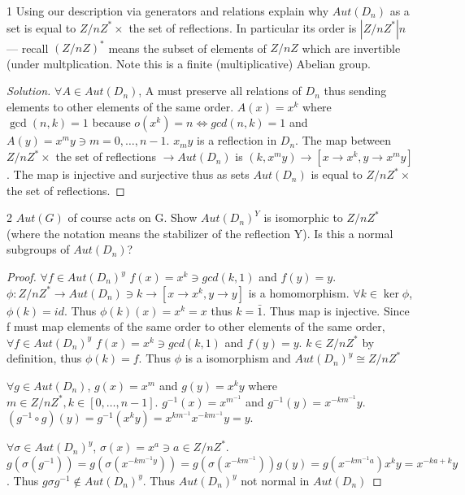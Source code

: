 \documentclass{article}
\newenvironment{solution}
{\renewcommand\qedsymbol{$\blacksquare$}\begin{proof}[Solution]}
{\end{proof}}
\begin{document}
\bigskip

\begin{PROB}{1}\label{Problem 1.}
    Using our description via generators and relations explain why $Aut(D_n)$ as a set is equal to $Z/nZ^* \times$ {the set of reflections}. In particular its order is $|Z/nZ^*| n$  --- recall $(Z/nZ)^*$ means the subset of elements of $Z/nZ$ which are invertible (under multplication. Note this is a finite (multiplicative) Abelian group. 
\end{PROB}
\begin{solution}
    $\forall A \in Aut(D_n)$, A must preserve all relations of $D_n$ thus sending elements to other elements of the same order. $A(x) = x^k$ where $\gcd(n, k) = 1$ because $o(x^k) = n \iff gcd(n, k) = 1$ and $A(y) = x^my \ni m = 0, \ldots, n-1.$ $x_my$ is a reflection in $D_n$. The map between $Z/nZ^* \times$ {the set of reflections} $\to Aut(D_n)$ is $(k, x^my) \to [x \to x^k, y \to x^my]$. The map is injective and surjective thus as sets $Aut(D_n)$ is equal to $Z/nZ^* \times$ {the set of reflections}.
\end{solution}

\bigskip

\begin{PROB}{2}\label{Problem 2.}
    $Aut(G)$ of course acts on G.  Show $Aut(D_n)^{Y}$ is isomorphic to $Z/nZ^*$ (where the notation means the stabilizer of the reflection Y). Is this a normal subgroups of $Aut(D_n)$?
\end{PROB}
\begin{proof}
    $\forall f \in Aut(D_n)^{y}$ $f(x) = x^k \ni gcd(k , 1)$ and $f(y) = y$. $\phi: Z/nZ^* \to Aut(D_n) \ni k \to [x \to x^k , y \to y]$ is a homomorphism. $\forall k \in \ker \phi$, $\phi(k) = id$. Thus $\phi(k)(x) = x^k = x$ thus $k = \bar{1}$. Thus map is injective. Since f must map elements of the same order to other elements of the same order, $\forall f \in Aut(D_n)^{y}$ $f(x) = x^k \ni gcd(k , 1)$ and $f(y) = y$. $k \in Z/nZ^*$ by definition, thus $\phi(k) = f$. Thus $\phi$ is a isomorphism and $ Aut(D_n)^{y} \cong Z/nZ^*$

    $\forall g \in Aut(D_n)$, $g(x) = x^m$ and $g(y) = x^ky$ where $m \in Z/nZ^*, k \in [0, \ldots, n-1]$. $g^{-1}(x) = x^{m^{-1}}$ and $g^{-1}(y) = x^{-km^{-1}}y$. $(g^{-1} \circ g)(y) = g^{-1}(x^ky) = x^{km^{-1}}x^{-km^{-1}}y = y$.  

    $\forall \sigma \in Aut(D_n)^y$, $\sigma(x) = x^a \ni a \in Z/nZ^*$. $g(\sigma(g^{-1})) = g(\sigma(x^{-km^{-1}y})) = g(\sigma(x^{-km^{-1}}))g(y) = g(x^{-km^{-1}a})x^ky = x^{-ka + k}y$. Thus $g \sigma g^{-1} \not \in Aut(D_n)^y$. Thus $Aut(D_n)^y $ not normal in $ Aut(D_n)$
\end{proof}
\end{document}
